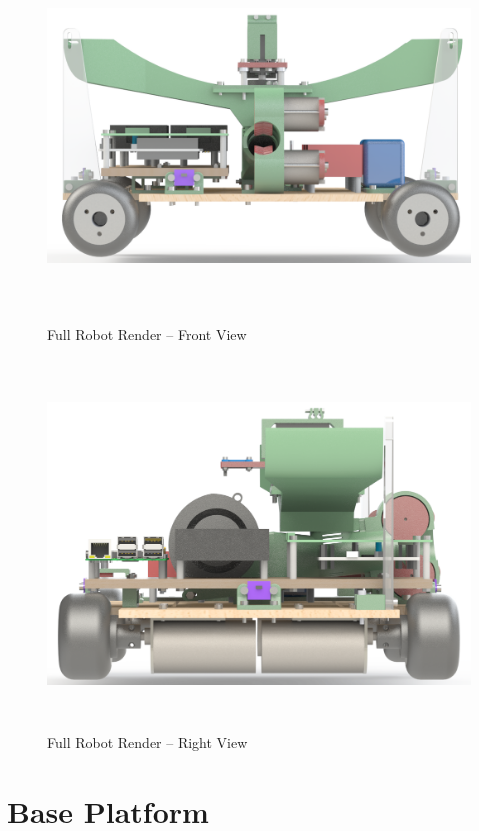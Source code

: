 \begin{figure}[H]   %
	\centering \includegraphics[width=6in, height=3.85in, keepaspectratio]{figures/render_front.png}
	\caption{Full Robot Render -- Front View}	\label{fig:render_front}
\end{figure}
\begin{figure}[H]   %
	\centering \includegraphics[width=6in, height=3.85in, keepaspectratio]{figures/render_right.png}
	\caption{Full Robot Render -- Right View}	\label{fig:render_right}
\end{figure}

\section{Base Platform}

